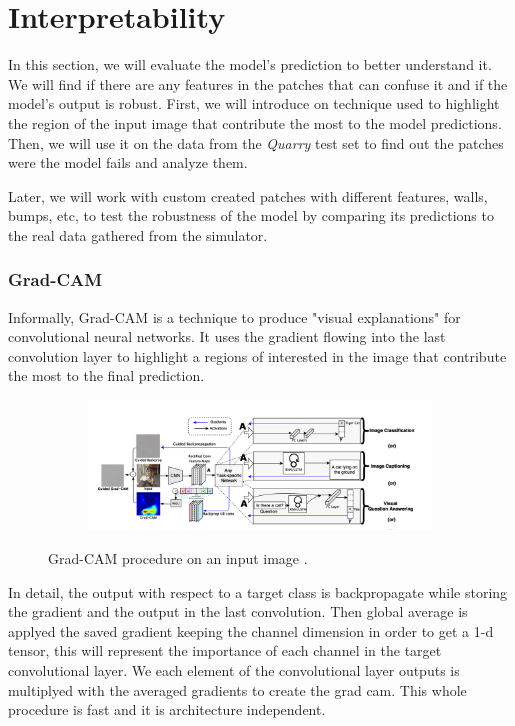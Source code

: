 \documentclass[../document.tex]{subfiles}
\begin{document}
\section{Interpretability}
In this section, we will evaluate the model's prediction to better understand it. We will find if there are any features in the patches that can confuse it and if the model's output is robust.
First, we will introduce on technique used to highlight the region of the input image that contribute the most to the model predictions. Then, we will use it on the data from the \emph{Quarry} test set to find out the patches were the model fails and analyze them.

Later, we will work with custom created patches with different features, walls, bumps, etc, to test the robustness of the model by comparing its predictions to the real data gathered from the simulator.

\subsubsection{Grad-CAM}
Informally, Grad-CAM \cite{gradcam} is a technique to produce "visual explanations" for convolutional neural networks. It uses the gradient flowing into the last convolution layer to highlight a regions of interested in the image that contribute the most to the final prediction. 

\begin{figure}[H]
    \centering
    \begin{subfigure}[b]{1\textwidth}
        \includegraphics[width=\linewidth]{../img/5/grad_cam1.png}
    \end{subfigure}
\caption{Grad-CAM procedure on an input image \cite{gradcam}.}
\end{figure}

In detail, the output with respect to a target class is backpropagate while storing the gradient and the output in the last convolution. Then global average is applyed the saved gradient keeping the channel dimension in order to get a 1-d tensor, this will represent the importance of each channel in the target convolutional layer. We  each element of the convolutional layer outputs is multiplyed with the averaged gradients to create the grad cam. This whole procedure is fast and it is architecture independent.
\end{document}
